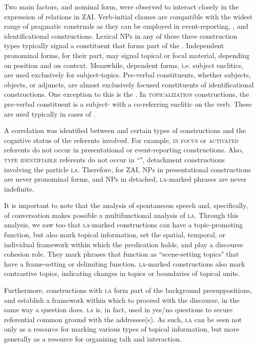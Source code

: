 \largerpage 
Two main factors,  and nominal form, were observed to interact closely in the expression of  relations in ZAI. Verb-initial clauses are compatible with the widest range of pragmatic construals as they can be employed in event-reporting, , and identificational constructions. Lexical NPs in any of these three construction types typically signal a constituent that forms part of the . Independent pronominal forms, for their part, may signal topical or focal material, depending on position and on context. Meanwhile, dependent forms, i.e. subject enclitics, are used exclusively for subject-topics. Pre-verbal constituents, whether subjects, objects, or adjuncts, are almost exclusively focused constituents of identificational constructions. One exception to this is the . In \textsc{topicalization} constructions, the pre-verbal constituent is a subject- with a co-referring enclitic on the verb. These are used typically in cases of .

A correlation was identified between  and certain types of constructions and the cognitive status of the referents involved. For example, \textsc{in focus} \citep{gundel1993} or \textsc{activated} referents do not occur in presentational or event-reporting constructions. Also, \textsc{type identifiable} referents do not occur in ``", detachment constructions involving the particle \textsc{la}. Therefore, for ZAI, NPs in presentational constructions are never pronominal forms, and NPs in detached, \textsc{la}-marked phrases are never indefinite.

It is important to note that the analysis of spontaneous speech and, specifically, of conversation makes possible a multifunctional analysis of \textsc{la}. Through this analysis, we saw too that \textsc{la}-marked constructions can have a topic-promoting function, but also mark topical information, set the spatial, temporal, or individual framework within which the predication holds, and play a discourse cohesion role. They mark phrases that function as ``scene-setting topics" that have a frame-setting or delimiting function. \textsc{la}-marked constructions also mark contrastive topics, indicating changes in topics or boundaries of topical units. 

Furthermore, constructions with \textsc{la} form part of the background presuppositions, and establish a framework within which to proceed with the discourse, in the same way a question does. \textsc{la} is, in fact, used in yes/no questions to secure referential common ground with the addressee(s). As such, \textsc{la} can be seen not only as a resource for marking various types of topical information, but more generally as a resource for organizing talk and interaction. 


